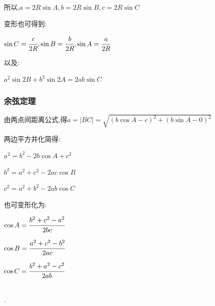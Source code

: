 {{所以,$a = 2R\sin A,b = 2R\sin B,c = 2R\sin C$

变形也可得到:

$\sin C = \cfrac{c}{2R},\sin B = \cfrac{b}{2R},\sin A = \cfrac{a}{2R}$

以及:

$a^2\sin2B + b^2\sin2A = 2ab\sin C$
}%

\subsubsection{余弦定理}{
  由两点间距离公式,得$a = |BC| = \sqrt{(b\cos A - c)^2 + (b\sin A - 0)^2}$

  两边平方并化简得:

  $a^2 = b^2 - 2b\cos A + c^2$

  $b^2 = a^2 + c^2 - 2ac\cos B$

  $c^2 = a^2 + b^2 - 2ab\cos C$

  也可变形化为:

  $\cos A = \cfrac{b^2 + c^2 - a^2}{2bc}$

  $\cos B = \cfrac{a^2 + c^2 - b^2}{2ac}$

  $\cos C = \cfrac{b^2 + a^2 - c^2}{2ab}$
}%
\\

.

}%